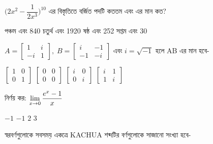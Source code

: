 \documentclass[addpoints]{exam}
\begin{document}
\begin{questions}
\begin{oneparchoices}
\end{oneparchoices}

\question $ \Big(2x^{2}-\dfrac{1}{2x^{3}}\Big)^{10} $ এর বিস্তৃতিতে বর্জিত পদটি কততম এবং এর মান কত?

\begin{oneparchoices}
\choice পঞ্চম এবং 840 
\choice চতুর্থ এবং 1920
\choice  ষষ্ঠ এবং 252 
\choice সপ্তম এবং 30

\end{oneparchoices}

\question  $A = \begin{bmatrix}
1 & i \\
-i & 1
\end{bmatrix},\; B = \begin{bmatrix}
i & -1 \\
-1 & -i
\end{bmatrix} $ এবং $ i = \sqrt{-1} $ হলে AB এর মান হবে- 

\begin{oneparchoices}
\choice  $\begin{bmatrix}
1 & 0 \\
0 & 1
\end{bmatrix} $
\choice   $\begin{bmatrix}
0 & 0 \\
0 & 0
\end{bmatrix} $
\choice   $\begin{bmatrix}
i & 0 \\
0 & i
\end{bmatrix} $
\choice   $\begin{bmatrix}
i & 1 \\
1 & i
\end{bmatrix} $
\end{oneparchoices}

\question নির্ণয় কর: $ \mathlarger{\lim_{x\to 0} \dfrac{e^{x} -1}{x}} $

\begin{oneparchoices}
\choice $ -1 $
\choice $ -1 $
\choice $ 2 $
\choice  $ 3 $

\end{oneparchoices}

\question  স্বরবর্ণগুলোকে সবসময় একত্রে KACHUA শব্দটির বর্ণগুলোকে সাজানো সংখ্যা হবে-

\begin{oneparchoices}

\end{oneparchoices}


\end{questions}
\end{document}
